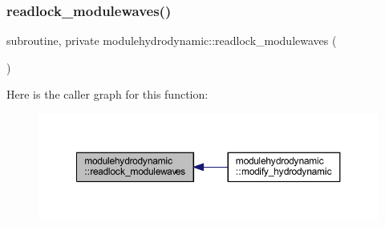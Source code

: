 \subsubsection{\texorpdfstring{readlock\+\_\+modulewaves()}{readlock\_modulewaves()}}
{\footnotesize\ttfamily subroutine, private modulehydrodynamic\+::readlock\+\_\+modulewaves (\begin{DoxyParamCaption}{ }\end{DoxyParamCaption})\hspace{0.3cm}{\ttfamily [private]}}

Here is the caller graph for this function\+:\nopagebreak
\begin{figure}[H]
\begin{center}
\leavevmode
\includegraphics[width=350pt]{namespacemodulehydrodynamic_af607bb807c6d67a54a48586646880d77_icgraph}
\end{center}
\end{figure}
\mbox{\label{namespacemodulehydrodynamic_afdbd6a69d8a99bcbad6b5c090639bc1b}} 
